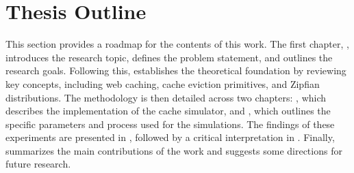 


\section{Thesis Outline}

This section provides a roadmap for the contents of this work. The first chapter, , introduces the research topic, defines the problem statement, and outlines the research goals. Following this,  establishes the theoretical foundation by reviewing key concepts, including web caching, cache eviction primitives, and Zipfian distributions. The methodology is then detailed across two chapters: , which describes the implementation of the cache simulator, and , which outlines the specific parameters and process used for the simulations. The findings of these experiments are presented in , followed by a critical interpretation in . Finally,  summarizes the main contributions of the work and suggests some directions for future research.